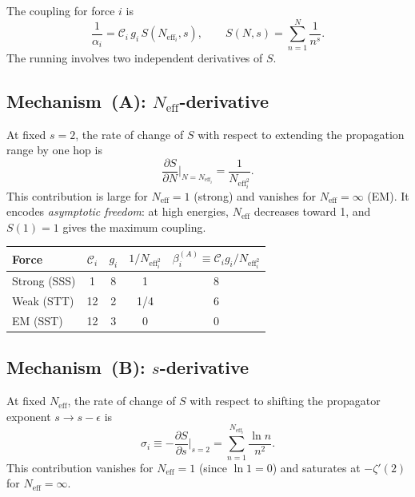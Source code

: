 \documentclass[12pt]{article}
\theoremstyle{definition}
\theoremstyle{remark}
\newcommand{\Neff}{N_{\mathrm{eff}}}
\begin{document}
The coupling for force $i$ is
\begin{equation}
  \frac{1}{\alpha_i} = \mathcal{C}_i \, g_i \, S(\Neff_i, s),
  \qquad
  S(N, s) = \sum_{n=1}^{N} \frac{1}{n^s}.
  \label{eq:coupling}
\end{equation}
The running involves two independent derivatives of $S$.

\subsection{Mechanism~(A): $\Neff$-derivative}

At fixed $s = 2$, the rate of change of $S$ with respect to
extending the propagation range by one hop is
\begin{equation}
  \frac{\partial S}{\partial N}\bigg|_{N=\Neff_i}
  = \frac{1}{\Neff_i^2}.
  \label{eq:mechA}
\end{equation}
This contribution is large for $\Neff = 1$ (strong)
and vanishes for $\Neff = \infty$ (EM).
It encodes \emph{asymptotic freedom}: at high energies,
$\Neff$ decreases toward 1,
and $S(1) = 1$ gives the maximum coupling.

\begin{center}
\begin{tabular}{lcccc}
\toprule
Force & $\mathcal{C}_i$ & $g_i$ & $1/\Neff_i^2$ &
  $\beta^{(A)}_i \equiv \mathcal{C}_i g_i / \Neff_i^2$ \\
\midrule
Strong (SSS) & 1 & 8 & 1 & 8 \\
Weak (STT) & 12 & 2 & 1/4 & 6 \\
EM (SST) & 12 & 3 & 0 & 0 \\
\bottomrule
\end{tabular}
\end{center}

\subsection{Mechanism~(B): $s$-derivative}

At fixed $\Neff$, the rate of change of $S$ with respect
to shifting the propagator exponent $s \to s - \epsilon$ is
\begin{equation}
  \sigma_i
  \equiv -\frac{\partial S}{\partial s}\bigg|_{s=2}
  = \sum_{n=1}^{\Neff_i} \frac{\ln n}{n^2}.
  \label{eq:mechB}
\end{equation}
This contribution vanishes for $\Neff = 1$
(since $\ln 1 = 0$) and saturates at $-\zeta'(2)$
for $\Neff = \infty$.
\end{document}
